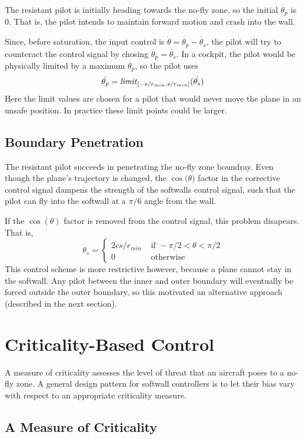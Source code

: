 \documentclass[11pt]{article}
\begin{document}
The resistant pilot is initially heading towards the no-fly zone, so
the initial $\dot{\theta_{p}}$ is $0$.  That is, the pilot intends to
maintain forward motion and crash into the wall.

Since, before saturation, the input control is $\dot{\theta} =
\dot{\theta_{p}} - \dot{\theta_{s}}$, the pilot will try to counteract
the control signal by chosing $\dot{\theta_{p}} = \dot{\theta_{s}}$.
In a cockpit, the pilot would be physically limited by a maximum
$\dot{\theta_{p}}$, so the pilot uses
\[
\dot{\theta_{p}} = \mbox{\textit{limit}}_{[-s/r_{min},s/r_{min}]}(\dot{\theta_{s}})
\]
Here the limit values are chosen for a pilot that would never move the
plane in an unsafe position.  In practice these limit points could be
larger.

\subsection{Boundary Penetration}

The resistant pilot succeeds in penetrating the no-fly zone boundray.
Even though the plane's trajectory is changed, the $\cos{\!(\theta})$ factor
in the corrective control signal dampens the strength of the softwalls
control signal, such that the pilot can fly into the softwall at a
$\pi/6$ angle from the wall.

If the $\cos{\!(\theta)}$ factor is removed from the control signal, this
problem disapears.  That is,
\[
\dot{\theta}_s = \left \{
\begin{array}{ll}
2 c s/r_{min}& \mbox{ if } -\pi / 2 < \theta < \pi / 2 \\
0 & \mbox{ otherwise}
\end{array}
\right .
\]
This control scheme is more restrictive however, because a plane
cannot stay in the softwall.  Any pilot between the inner and outer
boundary will eventually be forced outside the outer boundary, so this
motivated an alternative approach (described in the next section).

\section{Criticality-Based Control}

A measure of criticality assesses the level of threat that an aircraft poses to
a no-fly zone. A general design pattern for softwall controllers is to let their
bias vary with respect to an appropriate criticality measure.

\subsection{A Measure of Criticality}
\end{document}
